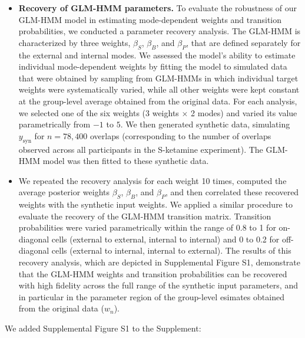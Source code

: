 \documentclass[
]{article}
\begin{document}
\begin{itemize}
\item
  \textbf{Recovery of GLM-HMM parameters.} To evaluate the robustness of
  our GLM-HMM model in estimating mode-dependent weights and transition
  probabilities, we conducted a parameter recovery analysis. The GLM-HMM
  is characterized by three weights, \(\beta_S\), \(\beta_B\), and
  \(\beta_P\), that are defined separately for the external and internal
  modes. We assessed the model's ability to estimate individual
  mode-dependent weights by fitting the model to simulated data that
  were obtained by sampling from GLM-HMMs in which individual target
  weights were systematically varied, while all other weights were kept
  constant at the group-level average obtained from the original data.
  For each analysis, we selected one of the six weights (3 weights
  \(\times\) 2 modes) and varied its value parametrically from \(-1\) to
  \(5\). We then generated synthetic data, simulating \(y_{\text{syn}}\)
  for \(n = 78{,}400\) overlaps (corresponding to the number of overlaps
  observed across all participants in the S-ketamine experiment). The
  GLM-HMM model was then fitted to these synthetic data.
\item
  We repeated the recovery analysis for each weight 10 times, computed
  the average posterior weights \(\beta_S\), \(\beta_B\), and
  \(\beta_P\), and then correlated these recovered weights with the
  synthetic input weights. We applied a similar procedure to evaluate
  the recovery of the GLM-HMM transition matrix. Transition
  probabilities were varied parametrically within the range of 0.8 to 1
  for on-diagonal cells (external to external, internal to internal) and
  0 to 0.2 for off-diagonal cells (external to internal, internal to
  external). The results of this recovery analysis, which are depicted
  in Supplemental Figure S1, demonstrate that the GLM-HMM weights and
  transition probabilities can be recovered with high fidelity across
  the full range of the synthetic input parameters, and in particular in
  the parameter region of the group-level esimates obtained from the
  original data (\(w_n\)).
\end{itemize}

We added Supplemental Figure S1 to the Supplement:
\end{document}

